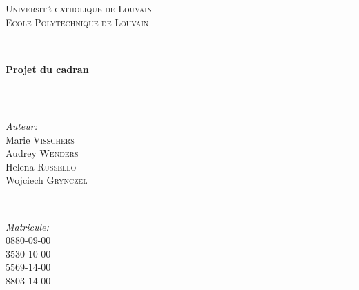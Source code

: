 	
	\begin{titlepage}
		
		\newcommand{\HRule}{\rule{\linewidth}{0.5mm}} %
		
		\center %
		
		
		\textsc{\LARGE Université catholique de Louvain}\\[1cm] %
		\textsc{\Large Ecole Polytechnique de Louvain}\\[0.5cm] %


		
		
		\HRule \\[0.4cm]
		{ \huge \bfseries Projet du cadran}\\[0.4cm] %
		\HRule \\[1.5cm]
		
		
		\begin{minipage}{0.4\textwidth}
			\begin{flushleft} \large
				\emph{Auteur:}\\
				Marie \textsc{Visschers}\\
				Audrey \textsc{Wenders}\\
				Helena \textsc{Russello}\\
				Wojciech \textsc{Grynczel}\\
			\end{flushleft}
		\end{minipage}
		~
		\begin{minipage}{0.4\textwidth}
			\begin{flushright} \large
				\emph{Matricule:} \\
				\textsc{0880-09-00}\\ %
				\textsc{3530-10-00}\\ %
				\textsc{5569-14-00}\\ %
				\textsc{8803-14-00}\\ %
			\end{flushright}
		\end{minipage}\\[2cm]
		

\end{titlepage}
